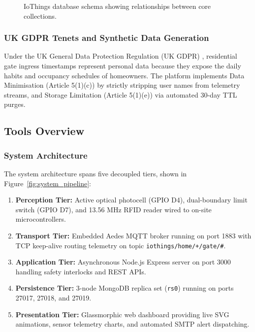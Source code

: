 \documentclass[11pt,a4paper]{article}
\begin{document}
\begin{figure}[htbp]
\caption{IoThings database schema showing relationships between core collections.}
\label{fig:schema_model}
\end{figure}

\subsubsection*{UK GDPR Tenets and Synthetic Data Generation}
Under the UK General Data Protection Regulation (UK GDPR) \citep{ico2021}, residential gate ingress timestamps represent personal data because they expose the daily habits and occupancy schedules of homeowners. The platform implements Data Minimisation (Article 5(1)(c)) by strictly stripping user names from telemetry streams, and Storage Limitation (Article 5(1)(e)) via automated 30-day TTL purges.

\subsection{Tools Overview}

\subsubsection{System Architecture}
The system architecture spans five decoupled tiers, shown in Figure~\ref{fig:system_pipeline}:
\begin{enumerate}[noitemsep]
    \item \textbf{Perception Tier:} Active optical photocell (GPIO D4), dual-boundary limit switch (GPIO D7), and 13.56 MHz RFID reader wired to on-site microcontrollers.
    \item \textbf{Transport Tier:} Embedded Aedes MQTT broker running on port 1883 with TCP keep-alive routing telemetry on topic \texttt{iothings/home/+/gate/\#}.
    \item \textbf{Application Tier:} Asynchronous Node.js Express server on port 3000 handling safety interlocks and REST APIs.
    \item \textbf{Persistence Tier:} 3-node MongoDB replica set (\texttt{rs0}) running on ports 27017, 27018, and 27019.
    \item \textbf{Presentation Tier:} Glassmorphic web dashboard providing live SVG animations, sensor telemetry charts, and automated SMTP alert dispatching.
\end{enumerate}
\end{document}
